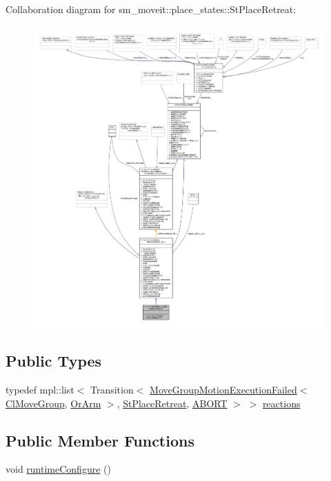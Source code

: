 Collaboration diagram for sm\+\_\+moveit\+:\+:place\+\_\+states\+:\+:St\+Place\+Retreat\+:
\nopagebreak
\begin{figure}[H]
\begin{center}
\leavevmode
\includegraphics[width=350pt]{structsm__moveit_1_1place__states_1_1StPlaceRetreat__coll__graph}
\end{center}
\end{figure}
\subsection*{Public Types}
\begin{DoxyCompactItemize}
\item 
typedef mpl\+::list$<$ Transition$<$ \hyperlink{structmoveit__z__client_1_1MoveGroupMotionExecutionFailed}{Move\+Group\+Motion\+Execution\+Failed}$<$ \hyperlink{classmoveit__z__client_1_1ClMoveGroup}{Cl\+Move\+Group}, \hyperlink{classsm__moveit_1_1OrArm}{Or\+Arm} $>$, \hyperlink{structsm__moveit_1_1place__states_1_1StPlaceRetreat}{St\+Place\+Retreat}, \hyperlink{classABORT}{A\+B\+O\+RT} $>$ $>$ \hyperlink{structsm__moveit_1_1place__states_1_1StPlaceRetreat_a63015ae143e5815bb2c3fb4a2f3dc16d}{reactions}
\end{DoxyCompactItemize}
\subsection*{Public Member Functions}
\begin{DoxyCompactItemize}
\item 
void \hyperlink{structsm__moveit_1_1place__states_1_1StPlaceRetreat_ab821f5ef9e9ffb35ba9f63917dac2854}{runtime\+Configure} ()
\end{DoxyCompactItemize}
